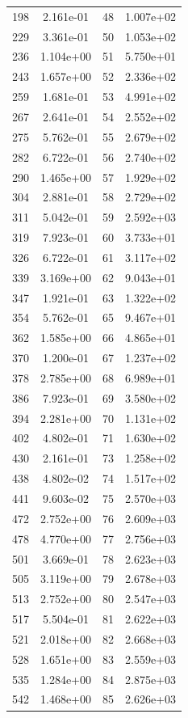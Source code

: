 \documentclass[12pt]{article}
\begin{document}
\begin{longtable}{@{}cccc@{}}
198 & 2.161e-01 & 48 & 1.007e+02 \\
229 & 3.361e-01 & 50 & 1.053e+02 \\
236 & 1.104e+00 & 51 & 5.750e+01 \\
243 & 1.657e+00 & 52 & 2.336e+02 \\
259 & 1.681e-01 & 53 & 4.991e+02 \\
267 & 2.641e-01 & 54 & 2.552e+02 \\
275 & 5.762e-01 & 55 & 2.679e+02 \\
282 & 6.722e-01 & 56 & 2.740e+02 \\
290 & 1.465e+00 & 57 & 1.929e+02 \\
304 & 2.881e-01 & 58 & 2.729e+02 \\
311 & 5.042e-01 & 59 & 2.592e+03 \\
319 & 7.923e-01 & 60 & 3.733e+01 \\
326 & 6.722e-01 & 61 & 3.117e+02 \\
339 & 3.169e+00 & 62 & 9.043e+01 \\
347 & 1.921e-01 & 63 & 1.322e+02 \\
354 & 5.762e-01 & 65 & 9.467e+01 \\
362 & 1.585e+00 & 66 & 4.865e+01 \\
370 & 1.200e-01 & 67 & 1.237e+02 \\
378 & 2.785e+00 & 68 & 6.989e+01 \\
386 & 7.923e-01 & 69 & 3.580e+02 \\
394 & 2.281e+00 & 70 & 1.131e+02 \\
402 & 4.802e-01 & 71 & 1.630e+02 \\
430 & 2.161e-01 & 73 & 1.258e+02 \\
438 & 4.802e-02 & 74 & 1.517e+02 \\
441 & 9.603e-02 & 75 & 2.570e+03 \\
472 & 2.752e+00 & 76 & 2.609e+03 \\
478 & 4.770e+00 & 77 & 2.756e+03 \\
501 & 3.669e-01 & 78 & 2.623e+03 \\
505 & 3.119e+00 & 79 & 2.678e+03 \\
513 & 2.752e+00 & 80 & 2.547e+03 \\
517 & 5.504e-01 & 81 & 2.622e+03 \\
521 & 2.018e+00 & 82 & 2.668e+03 \\
528 & 1.651e+00 & 83 & 2.559e+03 \\
535 & 1.284e+00 & 84 & 2.875e+03 \\
542 & 1.468e+00 & 85 & 2.626e+03 \\

\end{longtable}
\end{document}
